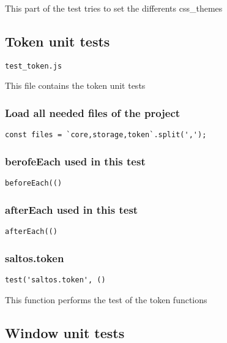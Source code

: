 \documentclass[a4paper]{article}
\begin{document}
This part of the test tries to set the differents css\_themes

\hypertarget{toc277}{}
\subsection{Token unit tests}

\begin{lstlisting}
test_token.js
\end{lstlisting}

This file contains the token unit tests

\hypertarget{toc278}{}
\subsubsection{Load all needed files of the project}

\begin{lstlisting}
const files = `core,storage,token`.split(',');
\end{lstlisting}

\hypertarget{toc279}{}
\subsubsection{berofeEach used in this test}

\begin{lstlisting}
beforeEach(()
\end{lstlisting}

\hypertarget{toc280}{}
\subsubsection{afterEach used in this test}

\begin{lstlisting}
afterEach(()
\end{lstlisting}

\hypertarget{toc281}{}
\subsubsection{saltos.token}

\begin{lstlisting}
test('saltos.token', ()
\end{lstlisting}

This function performs the test of the token functions

\hypertarget{toc282}{}
\subsection{Window unit tests}
\end{document}
